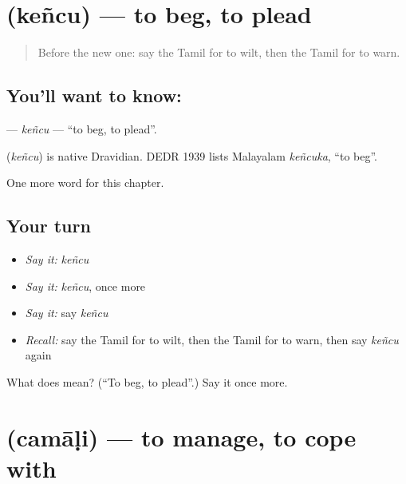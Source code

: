 \section[\texorpdfstring{\ta{கெஞ்சு} (keñcu)}{கெஞ்சு (keñcu)}]{ (keñcu) — to beg, to plead}

\label{lesson:TA-C231-kencu}



\begin{quote}
Before the new one: say the Tamil for to wilt, then the Tamil for to warn.
\end{quote}

\subsection*{You'll want to know: }
\textbf{} — \emph{keñcu} — \textquotedblleft{}to beg, to plead\textquotedblright{}.

\begin{cousinweb}
\textbf{} (\emph{keñcu}) is native Dravidian. DEDR 1939 lists Malayalam \emph{keñcuka}, \textquotedblleft{}to beg\textquotedblright{}.
\end{cousinweb}

\begin{grammarlens}[title={What you've built}]
One more word for this chapter.
\end{grammarlens}

\subsection*{Your turn}
\begin{itemize}
\raggedright
  \item \emph{Say it:} \emph{keñcu}
  \item \emph{Say it:} \emph{keñcu}, once more
  \item \emph{Say it:} say \emph{keñcu}
  \item \emph{Recall:} say the Tamil for to wilt, then the Tamil for to warn, then say \emph{keñcu} again
\end{itemize}

\begin{tcolorbox}[breakable,colback=teal!4,colframe=teal!35!black,title={Before you move on}]
What does  mean? (\textquotedblleft{}To beg, to plead\textquotedblright{}.) Say it once more.
\end{tcolorbox}
\section[\texorpdfstring{\ta{சமாளி} (camāḷi)}{சமாளி (camāḷi)}]{ (camāḷi) — to manage, to cope with}

